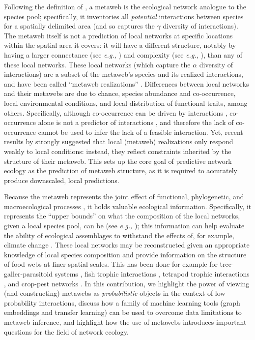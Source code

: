 Following the definition of \cite{Dunne2006Network}, a metaweb is the
ecological network analogue to the species pool; specifically, it
inventories all \emph{potential} interactions between species for a
spatially delimited area (and so captures the \(\gamma\) diversity of
interactions). The metaweb itself is not a prediction of local networks
at specific locations within the spatial area it covers: it will have a
different structure, notably by having a larger connectance (see
\emph{e.g.,} \cite{Wood2015Effects}) and complexity (see \emph{e.g.,}
\cite{Galiana2022Ecological}), than any of these local networks. These local
networks (which capture the \(\alpha\) diversity of interactions) are a
subset of the metaweb's species and its realized interactions, and have
been called ``metaweb realizations'' \cite{Poisot2015Species}.
Differences between local networks and their metawebs are due to chance,
species abundance and co-occurrence, local environmental conditions, and
local distribution of functional traits, among others. Specifically,
although co-occurrence can be driven by interactions
\cite{Cazelles2016Theory}, co-occurrence alone is not a predictor of
interactions \cite{Blanchet2020Cooccurrence, Thurman2019Testing}, and
therefore the lack of co-occurrence cannot be used to infer the lack of
a feasible interaction. Yet, recent results by \cite{Saravia2021Ecological}
strongly suggested that local (metaweb) realizations only respond weakly
to local conditions: instead, they reflect constraints inherited by the
structure of their metaweb. This sets up the core goal of predictive
network ecology as the prediction of metaweb structure, as it is
required to accurately produce downscaled, local predictions.

Because the metaweb represents the joint effect of functional,
phylogenetic, and macroecological processes
\cite{Morales-Castilla2015Inferring}, it holds valuable ecological
information. Specifically, it represents the ``upper bounds'' on what
the composition of the local networks, given a local species pool, can
be (see \emph{e.g.,} \cite{McLeod2021Sampling}); this information can help
evaluate the ability of ecological assemblages to withstand the effects
of, for example, climate change \cite{Fricke2022Effects}. These local
networks may be reconstructed given an appropriate knowledge of local
species composition and provide information on the structure of food
webs at finer spatial scales. This has been done for example for
tree-galler-parasitoid systems \cite{Gravel2018Bringing}, fish trophic
interactions \cite{Albouy2019Marine}, tetrapod trophic interactions
\cite{Braga2019Spatial, OConnor2020Unveiling}, and crop-pest networks
\cite{Grunig2020Crop}. In this contribution, we highlight the power of
viewing (and constructing) metawebs as \emph{probabilistic} objects in
the context of low-probability interactions, discuss how a family of
machine learning tools (graph embeddings and transfer learning) can be
used to overcome data limitations to metaweb inference, and highlight
how the use of metawebs introduces important questions for the field of
network ecology.

